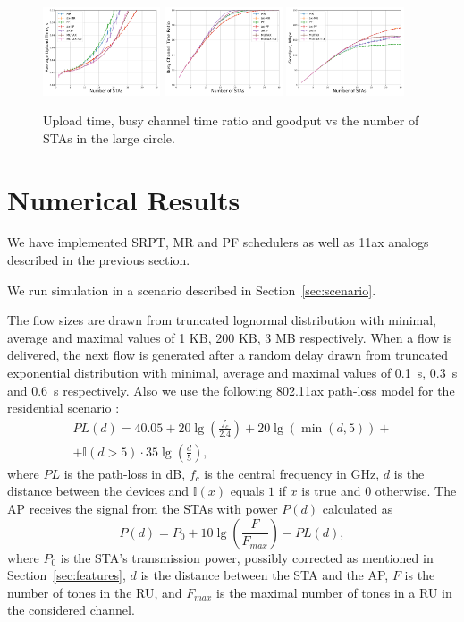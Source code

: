 \begin{figure}[bt]
	\centering
	\includegraphics[width = 0.31\textwidth]{20-d.pdf}
	\includegraphics[width = 0.31\textwidth]{20-e.pdf}
	\includegraphics[width = 0.31\textwidth]{20-t.pdf}
	\caption{\label{fig:20metres} Upload time, busy channel time ratio and goodput vs the number of STAs in the large circle.}
\end{figure}

\section{Numerical Results}
\label{sec:numerical}


We have implemented SRPT, MR and PF schedulers as well as 11ax analogs described in the previous section.

We run simulation in a scenario described in Section~\ref{sec:scenario}.

The flow sizes are drawn from truncated lognormal distribution with minimal, average and maximal values of 1 KB, 200 KB, 3 MB respectively. 
When a flow is delivered, the next flow is generated after a random delay drawn from truncated exponential distribution with minimal, average and maximal values of 0.1~s, 0.3~s and 0.6~s respectively.
Also we use the following 802.11ax path-loss model for the residential scenario \cite{presentation_scenarios}:
\begin{multline*}
PL(d) = 40.05 + 20 \lg\left(\frac{f_c}{2.4}\right) + 20 \lg(\min(d, 5)) + \\
+ \mathbb{I}(d > 5) \cdot 35 \lg\left(\frac{d}{5}\right),
\end{multline*}
where $PL$ is the path-loss in dB, $f_c$ is the central frequency in GHz, $d$ is the distance between the devices and $\mathbb{I}{(x) }$ equals $1$ if $x$ is true and $0$ otherwise.
The AP receives the signal from the STAs with power $P(d)$ calculated as
$$
P(d) = P_0 + 10 \lg\left(\frac{F}{F_{max}}\right) - PL(d),
$$
where $P_0$ is the STA's transmission power, possibly corrected as mentioned in Section~\ref{sec:features}, $d$ is the distance between the STA and the AP, $F$ is the number of tones in the RU, and $F_{max}$ is the maximal number of tones in a RU in the considered channel.


